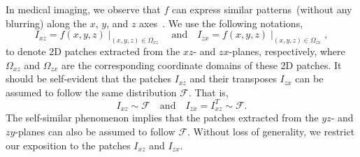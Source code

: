 \documentclass[runningheads]{llncs}
\begin{document}
In medical imaging, we observe that $f$ can express similar
patterns~(without any blurring) along the $x$, $y$, and $z$
axes~\cite{zhao-2018-smore, weigert-2017-fm}. We use the following
notations,
%
\begin{equation*}
%
I_{xz} = f(x, y, z) \mid_{(x, y, z) \in \Omega_{xz}}
\quad \mathrm{and} \quad
I_{zx} = f(x, y, z) \mid_{(x, y, z) \in \Omega_{zx}},
%
\end{equation*}
%
to denote 2D patches extracted from the $xz$- and $zx$-planes,
respectively, where $\Omega_{xz}$ and $\Omega_{zx}$ are the
corresponding coordinate domains of these 2D patches. It should be
self-evident that the patches $I_{xz}$ and their transposes $I_{zx}$
can be assumed to follow the same distribution $\mathcal{F}$. That is,
%
\begin{equation*}
%
I_{xz} \sim \mathcal{F}
\quad \mathrm{and} \quad
I_{zx}=I_{xz}^T \sim \mathcal{F}.
%
\end{equation*}
%
The self-similar phenomenon implies that the patches extracted from
the $yz$- and $zy$-planes can also be assumed to follow $\mathcal{F}$.
Without loss of generality, we restrict our exposition to the patches
$I_{xz}$ and $I_{zx}$.
\end{document}
